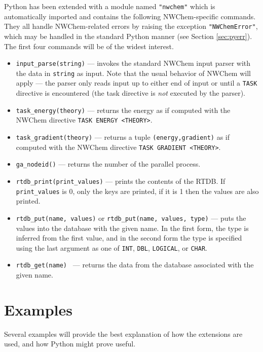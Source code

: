 Python has been extended with a module named \verb+"nwchem"+ which is
automatically imported and contains the following NWChem-specific
commands.  They all handle NWChem-related errors by raising the
exception \verb+"NWChemError"+, which may be handled in the standard
Python manner (see Section \ref{sec:pyerr}).  The first four commands
will be of the widest interest.
\begin{itemize}
\item \verb+input_parse(string)+ --- invokes the standard NWChem input
parser with the data in \verb+string+ as input.  Note that the usual
behavior of NWChem will apply --- the parser only reads input up to
either end of input or until a \verb+TASK+ directive is encountered
(the task directive is {\em not} executed by the parser).

\item \verb+task_energy(theory)+ --- returns the energy as if computed
with the NWChem directive \verb+TASK ENERGY <THEORY>+.

\item \verb+task_gradient(theory)+ --- returns a tuple
\verb+(energy,gradient)+ as if computed with the NWChem
directive \verb+TASK GRADIENT <THEORY>+.

\item \verb+ga_nodeid()+ --- returns the number of the parallel
process.

\item \verb+rtdb_print(print_values)+ --- prints the contents of the
RTDB.  If \verb+print_values+ is 0, only the keys are printed, if it
is 1 then the values are also printed.

\item \verb+rtdb_put(name, values)+ or
\verb+rtdb_put(name, values, type)+ --- puts the values into the
database with the given name.  In the first form, the type is inferred
from the first value, and in the second form the type is specified
using the last argument as one of \verb+INT+, \verb+DBL+,
\verb+LOGICAL+, or \verb+CHAR+.

\item \verb+rtdb_get(name) + --- returns the data from the database
associated with the given name.
\end{itemize}

\section{Examples}

Several examples will provide the best explanation of how the extensions
are used, and how Python might prove useful.

